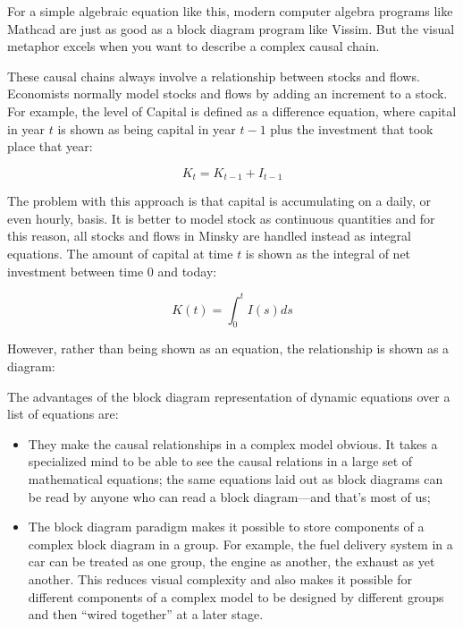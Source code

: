 \begin{center}
\end{center}

For a simple algebraic equation like this, modern computer algebra
programs like Mathcad are just as good as a block diagram program like
Vissim. But the visual metaphor excels when you want to describe a
complex causal chain.


These causal chains always involve a relationship between stocks and
flows. Economists normally model stocks and flows by adding an
increment to a stock. For example, the level of Capital is defined as
a difference equation, where capital in year $t$ is shown as being 
capital in year $t-1$ plus the investment that took place that year:

\begin{displaymath}
K_t=K_{t-1}+I_{t-1}
\end{displaymath}

The problem with this approach is that capital is accumulating on a daily, 
or even hourly, basis. It is better to model stock as continuous quantities
and for this reason, all stocks and flows in Minsky are handled instead 
as integral equations. The amount of capital at time $t$ is shown as 
the integral of net investment between time 0 and today:

\begin{displaymath}
K(t)=\int_0^t I(s)ds
\end{displaymath}

However, rather than being shown as an equation, the relationship is shown as a diagram:

\begin{center}
\end{center}

The advantages of the block diagram representation of dynamic equations
over a list of equations are:
\begin{itemize}
\item    They make the causal relationships in a complex model
  obvious. It takes a specialized mind to be able to see the causal
  relations in a large set of mathematical equations; the same
  equations laid out as block diagrams can be read by anyone who can read
  a block diagram---and that's most of us;
\item The block diagram paradigm makes it possible to store components of
  a complex block diagram in a group. For example, the fuel delivery
  system in a car can be treated as one group, the engine as another,
  the exhaust as yet another. This reduces visual complexity and also
  makes it possible for different components of a complex model to be
  designed by different groups and then ``wired together'' at a later
  stage.
\end{itemize}

